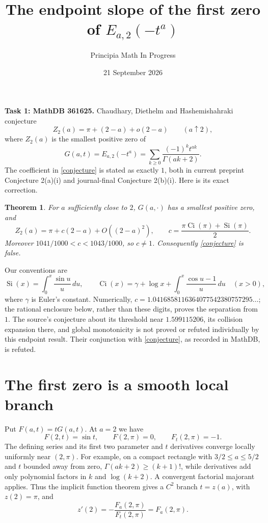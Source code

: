 \documentclass[11pt]{article}
\title{The endpoint slope of the first zero of $E_{a,2}(-t^a)$}
\author{Principia Math In Progress}
\date{21 September 2026}
\newtheorem{theorem}{Theorem}
\newcommand{\Si}{\operatorname{Si}}
\newcommand{\Ci}{\operatorname{Ci}}
\begin{document}
\maketitle
\noindent\textbf{Task 1: MathDB 361625.}
Chaudhary, Diethelm and Hashemishahraki \cite{CDH} conjecture
\begin{equation}\label{conjecture}
 Z_2(a)=\pi+(2-a)+o(2-a)\qquad(a\uparrow2),
\end{equation}
where $Z_2(a)$ is the smallest positive zero of
\[
 G(a,t)=E_{a,2}(-t^a)=\sum_{k\geq0}\frac{(-1)^kt^{ak}}{\Gamma(ak+2)}.
\]
The coefficient in \eqref{conjecture} is stated as exactly $1$, both in
current preprint Conjecture 2(a)(i) and journal-final Conjecture 2(b)(i).
Here is its exact correction.

\begin{theorem}\label{main}
For $a$ sufficiently close to $2$, $G(a,\cdot)$ has a smallest positive
zero, and
\[
 \boxed{Z_2(a)=\pi+c(2-a)+O((2-a)^2),\qquad
 c=\frac{\pi\Ci(\pi)+\Si(\pi)}2.}
\]
Moreover $1041/1000<c<1043/1000$, so $c\ne1$.
Consequently \eqref{conjecture} is false.
\end{theorem}

Our conventions are
\[
 \Si(x)=\int_0^x\frac{\sin u}{u}\,du,\qquad
 \Ci(x)=\gamma+\log x+\int_0^x\frac{\cos u-1}{u}\,du
 \quad(x>0),
\]
where $\gamma$ is Euler's constant. Numerically,
$c=1.0416858116364077542380757295\ldots$; the rational enclosure
below, rather than these digits, proves the separation from $1$.
The source's conjecture about its threshold near $1.599115206$, its
collision expansion there, and global monotonicity is not proved or
refuted individually by this endpoint result. Their conjunction with
\eqref{conjecture}, as recorded in MathDB, is refuted.

\section*{The first zero is a smooth local branch}
Put $F(a,t)=tG(a,t)$. At $a=2$ we have
\[
 F(2,t)=\sin t,\qquad F(2,\pi)=0,\qquad F_t(2,\pi)=-1.
\]
The defining series and its first two parameter and $t$ derivatives
converge locally uniformly near $(2,\pi)$. For example, on a compact
rectangle with $3/2\leq a\leq5/2$ and $t$ bounded away from zero,
$\Gamma(ak+2)\geq(k+1)!$, while derivatives add only polynomial
factors in $k$ and $\log(k+2)$. A convergent factorial majorant applies.
Thus the implicit function theorem gives a $C^2$ branch $t=z(a)$,
with $z(2)=\pi$, and
\begin{equation}\label{slope}
 z'(2)=-\frac{F_a(2,\pi)}{F_t(2,\pi)}=F_a(2,\pi).
\end{equation}
\end{document}

